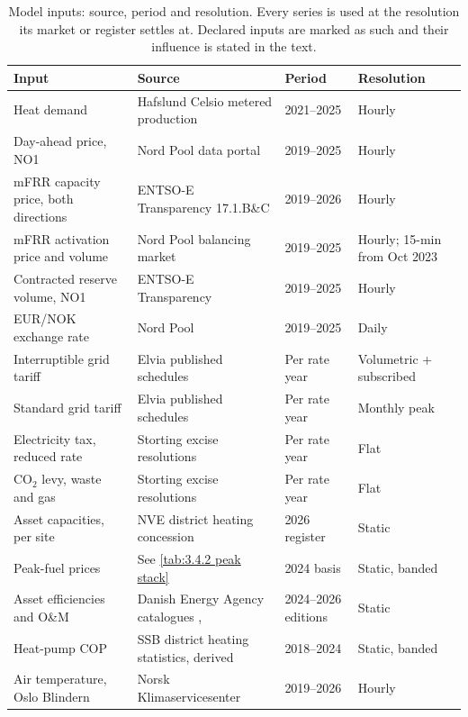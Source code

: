 \begin{table}[h]
\centering
\caption{Model inputs: source, period and resolution. Every series is used at the resolution its market or register settles at. Declared inputs are marked as such and their influence is stated in the text.}
\small
\begin{tabular}{p{3.4cm} p{5.4cm} p{2.4cm} p{2.2cm}}
\toprule
\textbf{Input} & \textbf{Source} & \textbf{Period} & \textbf{Resolution} \\
\midrule
Heat demand & Hafslund Celsio metered production & 2021--2025 & Hourly \\
Day-ahead price, NO1 & Nord Pool data portal \cite{nord_pool_nord_nodate} & 2019--2025 & Hourly \\
mFRR capacity price, both directions & ENTSO-E Transparency 17.1.B\&C \cite{entsoe_entsoe_nodate} & 2019--2026 & Hourly \\
mFRR activation price and volume & Nord Pool balancing market \cite{nord_pool_nord_nodate} & 2019--2025 & Hourly; 15-min from Oct 2023 \\
Contracted reserve volume, NO1 & ENTSO-E Transparency \cite{entsoe_entsoe_nodate} & 2019--2025 & Hourly \\
EUR/NOK exchange rate & Nord Pool \cite{nord_pool_nord_nodate} & 2019--2025 & Daily \\
Interruptible grid tariff & Elvia published schedules \cite{elvia_dagens_2022} & Per rate year & Volumetric + subscribed \\
Standard grid tariff & Elvia published schedules \cite{elvia_dagens_2022} & Per rate year & Monthly peak \\
Electricity tax, reduced rate & Storting excise resolutions \cite{stortinget_stortingsvedtak_nodate} & Per rate year & Flat \\
CO$_2$ levy, waste and gas & Storting excise resolutions \cite{stortinget_stortingsvedtak_nodate} & Per rate year & Flat \\
Asset capacities, per site & NVE district heating concession \cite{nve_konsesjonssak_2026} & 2026 register & Static \\
Peak-fuel prices & See \autoref{tab:3.4.2 peak stack} & 2024 basis & Static, banded \\
Asset efficiencies and O\&M & Danish Energy Agency catalogues \cite{danish_energy_agency_technology_2024}, \cite{danish_energy_agency_energy_2025} & 2024--2026 editions & Static \\
Heat-pump COP & SSB district heating statistics, derived \cite{statistisk_sentralbyra_statbank_nodate} & 2018--2024 & Static, banded \\
Air temperature, Oslo Blindern & Norsk Klimaservicesenter \cite{norsk_klima_service_senter_observasjoner_nodate} & 2019--2026 & Hourly \\
\bottomrule
\end{tabular}
\label{tab:3.4.2 model input}
\end{table}

